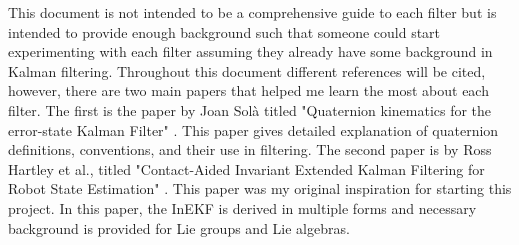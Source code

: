 This document is not intended to be a comprehensive guide to each filter but is intended to provide enough background such that someone could start experimenting with each filter assuming they already have some background in Kalman filtering. Throughout this document different references will be cited, however, there are two main papers that helped me learn the most about each filter. The first is the paper by Joan Sol{\`{a}} titled "Quaternion kinematics for the error-state Kalman Filter" \cite{Quaternion_Kinematics_for_the_Error-state_EKF}. This paper gives detailed explanation of quaternion definitions, conventions, and their use in filtering. The second paper is by Ross Hartley et al., titled "Contact-Aided Invariant Extended Kalman Filtering for Robot State Estimation" \cite{Contact-Aided_Invarant_EKF}. This paper was my original inspiration for starting this project. In this paper, the InEKF is derived in multiple forms and necessary background is provided for Lie groups and Lie algebras.

